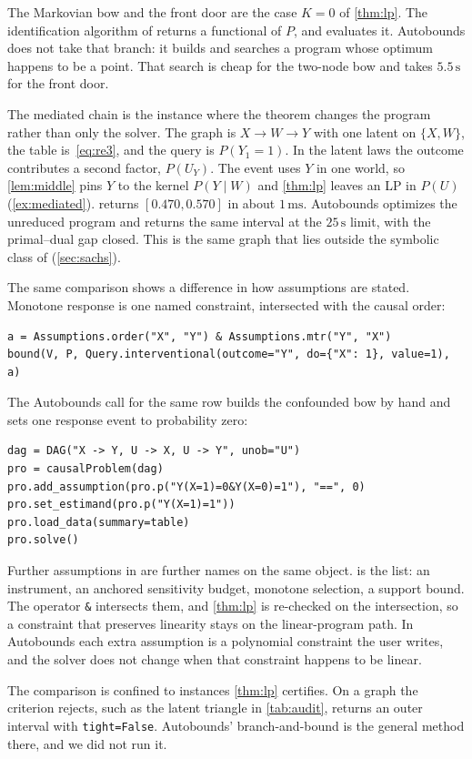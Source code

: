 The Markovian bow and the front door are the case $K=0$ of \cref{thm:lp}.
The identification algorithm of \citet{shpitser2006identification} returns a
functional of $P$, and \pid{} evaluates it. Autobounds does not
take that branch: it builds and searches a program whose optimum happens to
be a point. That search is cheap for the two-node bow and takes
$5.5\,\mathrm{s}$ for the front door.

The mediated chain is the instance where the theorem changes the program
rather than only the solver. The graph is $X\to W\to Y$ with one latent on
$\{X,W\}$, the table is~\eqref{eq:re3}, and the query is $P(Y_1{=}1)$. In the
latent laws the outcome contributes a second factor, $P(U_Y)$. The event uses
$Y$ in one world, so \cref{lem:middle} pins $Y$ to the kernel $P(Y\mid W)$
and \cref{thm:lp} leaves an LP in $P(U)$ (\cref{ex:mediated}).
\pid{} returns $[0.470,0.570]$ in about $1\,\mathrm{ms}$.
Autobounds optimizes the unreduced program and returns the same interval at
the $25\,\mathrm{s}$ limit, with the primal--dual gap closed. This is the
same graph that lies outside the symbolic class of
\citet{symbolicbounds2023general} (\cref{sec:sachs}).

The same comparison shows a difference in how assumptions are stated. Monotone
response is one named constraint, intersected with the causal order:
\begin{lstlisting}
a = Assumptions.order("X", "Y") & Assumptions.mtr("Y", "X")
bound(V, P, Query.interventional(outcome="Y", do={"X": 1}, value=1), a)
\end{lstlisting}
The Autobounds call for the same row builds the confounded bow by hand and
sets one response event to probability zero:
\begin{lstlisting}
dag = DAG("X -> Y, U -> X, U -> Y", unob="U")
pro = causalProblem(dag)
pro.add_assumption(pro.p("Y(X=1)=0&Y(X=0)=1"), "==", 0)
pro.set_estimand(pro.p("Y(X=1)=1"))
pro.load_data(summary=table)
pro.solve()
\end{lstlisting}
Further assumptions in \pid{} are further names on the same
object.  is the list: an instrument, an anchored sensitivity
budget, monotone selection, a support bound. The operator \texttt{\&}
intersects them, and \cref{thm:lp} is re-checked on the intersection, so a
constraint that preserves linearity stays on the linear-program path. In
Autobounds each extra assumption is a polynomial constraint the user writes,
and the solver does not change when that constraint happens to be linear.

The comparison is confined to instances \cref{thm:lp} certifies. On a graph
the criterion rejects, such as the latent triangle in \cref{tab:audit},
\pid{} returns an outer interval with \texttt{tight=False}.
Autobounds' branch-and-bound is the general method there, and we did not run
it.
